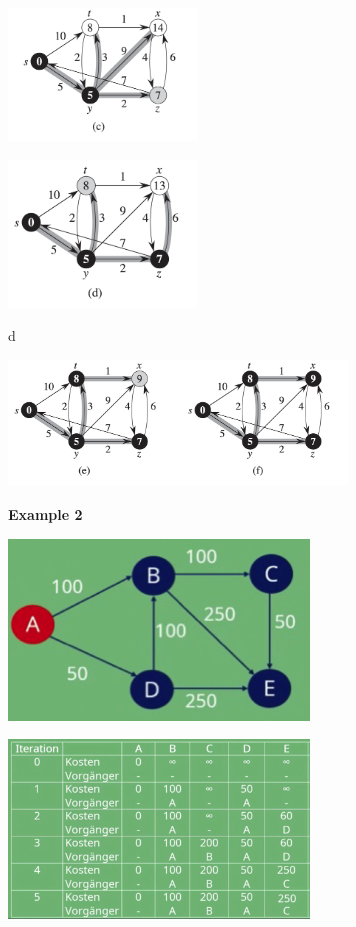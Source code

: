 \documentclass[10pt,a4paper,twocolumn]{article}
\begin{document}
\begin{center}
	\includegraphics[width=5cm]{images/dijkstra-example_2}
\end{center}

\begin{center}
	\includegraphics[width=5cm]{images/dijkstra-example_3}
\end{center}
d
\begin{center}
	\includegraphics[width=9cm]{images/dijkstra-example_4}
\end{center}


\textbf{Example 2}
\begin{center}
	\includegraphics[width=8cm]{images/dijkstra-example2}
\end{center}

\begin{center}
	\includegraphics[width=8cm]{images/dijkstra-example22}
\end{center}
\end{document}

